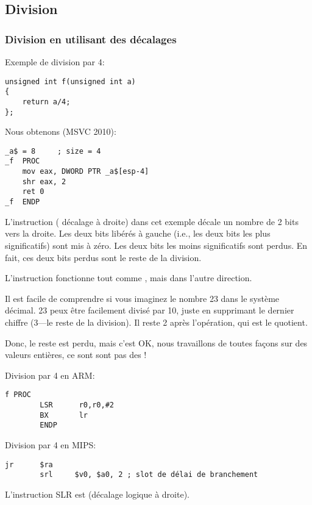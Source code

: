 \subsection{Division}

\subsubsection{Division en utilisant des décalages}
\label{division_by_shifting}

Exemple de division par 4:

\begin{lstlisting}[style=customc]
unsigned int f(unsigned int a)
{
	return a/4;
};
\end{lstlisting}

Nous obtenons (MSVC 2010):

\begin{lstlisting}[caption=MSVC 2010,style=customasmx86]
_a$ = 8		; size = 4
_f	PROC
	mov	eax, DWORD PTR _a$[esp-4]
	shr	eax, 2
	ret	0
_f	ENDP
\end{lstlisting}

\label{SHR}

L'instruction \SHR ( décalage à droite) dans cet exemple décale un
nombre de 2 bits vers la droite.
Les deux bits libérés à gauche (i.e., les deux bits les plus significatifs) sont
mis à zéro.
Les deux bits les moins significatifs sont perdus.
En fait, ces deux bits perdus sont le reste de la division.


L'instruction \SHR fonctionne tout comme \SHL, mais dans l'autre direction.



Il est facile de comprendre si vous imaginez le nombre 23 dans le système décimal.
23 peux être facilement divisé par 10, juste en supprimant le dernier chiffre (3---le
reste de la division).
Il reste 2 après l'opération, qui est le \gls{quotient}.

Donc, le reste est perdu, mais c'est OK, nous travaillons de toutes façons sur des
valeurs entières, ce sont sont pas des !

Division par 4 en ARM:

\begin{lstlisting}[caption=\NonOptimizingKeilVI (\ARMMode),style=customasmARM]
f PROC
        LSR      r0,r0,#2
        BX       lr
        ENDP
\end{lstlisting}

Division par 4 en MIPS:

\begin{lstlisting}[caption=GCC 4.4.5 \Optimizing (IDA),style=customasmMIPS]
        jr      $ra
        srl     $v0, $a0, 2 ; slot de délai de branchement
\end{lstlisting}

L'instruction SLR est  (décalage logique à droite).
